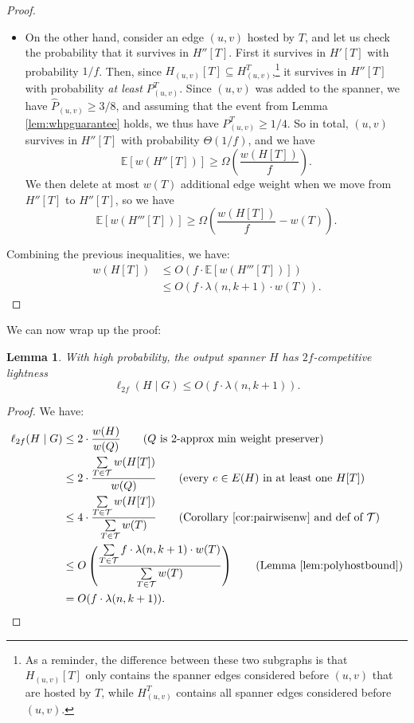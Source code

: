 \documentclass{article}
\theoremstyle{plain}
\newtheorem{lemma}[theorem]{Lemma}
\theoremstyle{definition}
\newcommand{\tee}{\mathcal{T}}
\begin{document}
\begin{proof}
\begin{itemize}
\item On the other hand, consider an edge $(u, v)$ hosted by $T$, and let us check the probability that it survives in $H''[T]$.
First it survives in $H'[T]$ with probability $1/f$.
Then, since $H_{(u, v)}[T] \subseteq H_{(u, v)}^T$,\footnote{As a reminder, the difference between these two subgraphs is that $H_{(u, v)}[T]$ only contains the spanner edges considered before $(u, v)$ that are hosted by $T$, while $H_{(u, v)}^T$ contains all spanner edges considered before $(u, v)$.} it survives in $H''[T]$ with probability \emph{at least} $P_{(u, v)}^T$.
Since $(u, v)$ was added to the spanner, we have $\widehat{P}_{(u, v)} \ge 3/8$, and assuming that the event from Lemma \ref{lem:whpguarantee} holds, we thus have $P_{(u, v)}^T \ge 1/4$.
So in total, $(u, v)$ survives in $H''[T]$ with probability $\Theta(1/f)$, and we have
$$\mathbb{E}\left[w(H''[T])\right] \ge \Omega\left(\frac{w(H[T])}{f} \right).$$
We then delete at most $w(T)$ additional edge weight when we move from $H''[T]$ to $H''[T]$, so we have
$$\mathbb{E}\left[w(H'''[T])\right] \ge \Omega\left(\frac{w(H[T])}{f} - w(T)\right).$$
\end{itemize}

Combining the previous inequalities, we have:
\begin{align*}
w(H[T]) &\le O\left(f \cdot \mathbb{E}\left[w(H'''[T])\right]\right)\\
&\le O\left(f \cdot \lambda(n, k+1) \cdot w(T)\right). \tag*{\qedhere}
\end{align*}
\end{proof}

We can now wrap up the proof:
\begin{lemma} \label{lem:poly-light}
With high probability, the output spanner $H$ has $2f$-competitive lightness
$$\ell_{2f}(H \mid G) \le O\left( f \cdot \lambda(n, k+1) \right).$$
\end{lemma}
\begin{proof}
We have:
\begin{align*}
\ell_{2f}(H \mid G) &\le 2 \cdot \frac{w(H)}{w(Q)} \tag{$Q$ is $2$-approx min weight preserver}\\
&\leq 2 \cdot \frac{\sum \limits_{T \in \tee} w(H[T])}{w(Q)} \tag{every $e \in E(H)$ in at least one $H[T]$} \\ 
&\leq 4 \cdot \frac{\sum \limits_{T \in \tee} w(H[T])}{\sum \limits_{T \in \tee} w(T)} \tag{Corollary~\ref{cor:pairwisenw} and def of $\tee$}\\
&\le  O\left( \frac{\sum \limits_{T \in \tee} f \cdot \lambda(n, k+1) \cdot w(T)}{\sum \limits_{T \in \tee} w(T)} \right) \tag{Lemma \ref{lem:polyhostbound}}\\
&= O(f \cdot \lambda(n, k+1)). \tag*{\qedhere}
\end{align*}
\end{proof}
\end{document}
